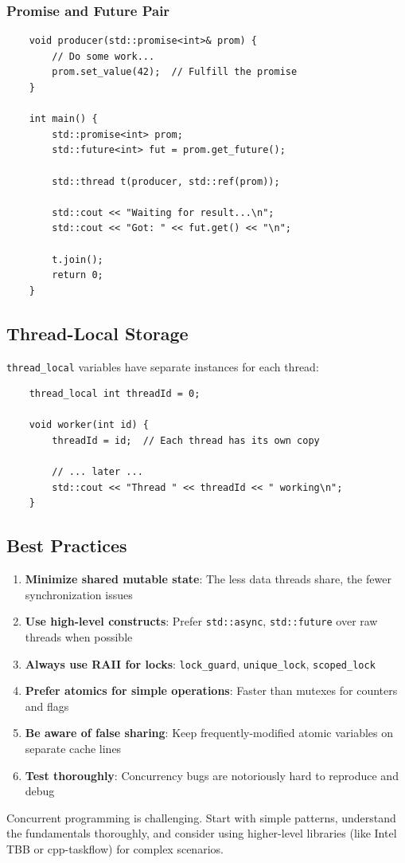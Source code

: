 \subsubsection{Promise and Future Pair}

\begin{lstlisting}
	void producer(std::promise<int>& prom) {
		// Do some work...
		prom.set_value(42);  // Fulfill the promise
	}
	
	int main() {
		std::promise<int> prom;
		std::future<int> fut = prom.get_future();
		
		std::thread t(producer, std::ref(prom));
		
		std::cout << "Waiting for result...\n";
		std::cout << "Got: " << fut.get() << "\n";
		
		t.join();
		return 0;
	}
\end{lstlisting}

\subsection{Thread-Local Storage}

\texttt{thread\_local} variables have separate instances for each thread:

\begin{lstlisting}
	thread_local int threadId = 0;
	
	void worker(int id) {
		threadId = id;  // Each thread has its own copy
		
		// ... later ...
		std::cout << "Thread " << threadId << " working\n";
	}
\end{lstlisting}

\subsection{Best Practices}

\begin{enumerate}
	\item \textbf{Minimize shared mutable state}: The less data threads share, the fewer synchronization issues
	
	\item \textbf{Use high-level constructs}: Prefer \texttt{std::async}, \texttt{std::future} over raw threads when possible
	
	\item \textbf{Always use RAII for locks}: \texttt{lock\_guard}, \texttt{unique\_lock}, \texttt{scoped\_lock}
	
	\item \textbf{Prefer atomics for simple operations}: Faster than mutexes for counters and flags
	
	\item \textbf{Be aware of false sharing}: Keep frequently-modified atomic variables on separate cache lines
	
	\item \textbf{Test thoroughly}: Concurrency bugs are notoriously hard to reproduce and debug
\end{enumerate}

\begin{remark}
	Concurrent programming is challenging. Start with simple patterns, understand the fundamentals thoroughly, and consider using higher-level libraries (like Intel TBB or cpp-taskflow) for complex scenarios.
\end{remark}